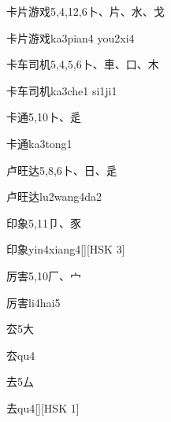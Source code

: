 \begin{entry}{卡片游戏}{5,4,12,6}{⼘、⽚、⽔、⼽}
  \begin{phonetics}{卡片游戏}{ka3pian4 you2xi4}
  \end{phonetics}
\end{entry}

\begin{entry}{卡车司机}{5,4,5,6}{⼘、⾞、⼝、⽊}
  \begin{phonetics}{卡车司机}{ka3che1 si1ji1}
  \end{phonetics}
\end{entry}

\begin{entry}{卡通}{5,10}{⼘、⾡}
  \begin{phonetics}{卡通}{ka3tong1}
  \end{phonetics}
\end{entry}

\begin{entry}{卢旺达}{5,8,6}{⼘、⽇、⾡}
  \begin{phonetics}{卢旺达}{lu2wang4da2}
  \end{phonetics}
\end{entry}

\begin{entry}{印象}{5,11}{⼙、⾗}
  \begin{phonetics}{印象}{yin4xiang4}[][HSK 3]
  \end{phonetics}
\end{entry}

\begin{entry}{厉害}{5,10}{⼚、⼧}
  \begin{phonetics}{厉害}{li4hai5}
  \end{phonetics}
\end{entry}

\begin{entry}{厺}{5}{⼤}
  \begin{phonetics}{厺}{qu4}
  \end{phonetics}
\end{entry}

\begin{entry}{去}{5}{⼛}
  \begin{phonetics}{去}{qu4}[][HSK 1]
  \end{phonetics}
\end{entry}

